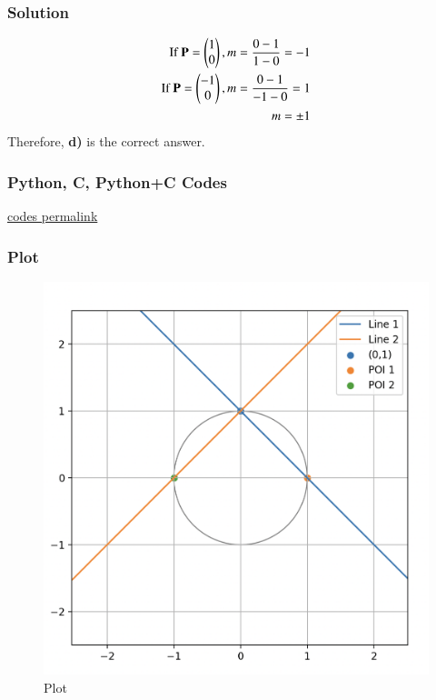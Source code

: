 \documentclass{beamer}
\begin{document}
\begin{frame}[fragile]
    \frametitle{Solution}
\begin{align}
\text{If } \mathbf{P} = \begin{pmatrix}1\\0\end{pmatrix}, m = \frac{0-1}{1-0} = -1   \\
\text{If } \mathbf{P} = \begin{pmatrix}-1\\0\end{pmatrix}, m = \frac{0-1}{-1-0} = 1 \\
m = \pm1
\end{align}
Therefore, \textbf{d)} is the correct answer.
\end{frame}

\begin{frame}[fragile]
    \frametitle{Python, C, Python+C Codes}

\href{https://github.com/AdityaAppana/ee1030-2025/tree/5566ea7440201ccd9272d7bb9e0aff34b15ff365/ee25btech11004/matgeo/4.10.2/Codes}{codes permalink}

\end{frame}

\begin{frame}
\frametitle{Plot}
\begin{figure}[H]
    \centering
    \includegraphics[width=0.6\columnwidth]{Figs/7411.png}
    \caption{Plot}
    \label{fig:placeholder}
\end{figure}

\end{frame}
\end{document}
